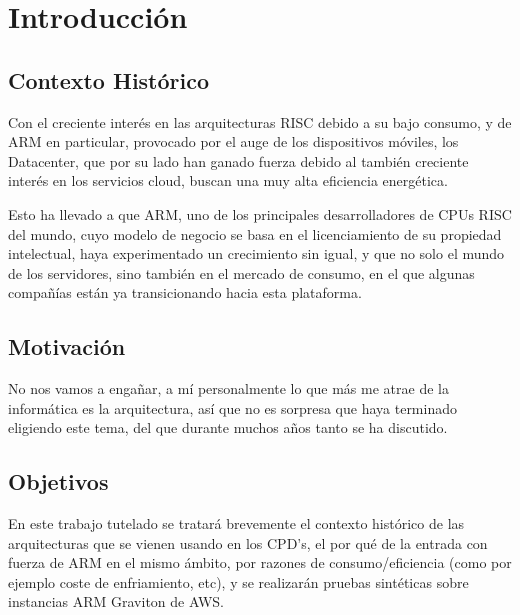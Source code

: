 \documentclass[a4paper,openright,12pt]{article}
\begin{document}
\section{Introducción}\label{section:introduccion}
\subsection{Contexto Histórico}
Con el creciente interés en las arquitecturas RISC debido a su bajo consumo, y de ARM en particular, provocado por el auge de los dispositivos móviles,
los Datacenter, que por su lado han ganado fuerza debido al también creciente interés en los servicios cloud, buscan una muy alta eficiencia
energética.

Esto ha llevado a que ARM, uno de los principales desarrolladores de CPUs RISC del mundo, cuyo modelo de negocio se basa en el licenciamiento de su propiedad intelectual,
haya experimentado un crecimiento sin igual, y que no solo el mundo de los servidores, sino también en el mercado de consumo, en el que algunas compañías están ya transicionando
hacia esta plataforma. \parencite{apple_m1_overview}

\subsection{Motivación}\label{subsection:motivacion}
No nos vamos a engañar, a mí personalmente lo que más me atrae de la informática es la arquitectura, así que no es sorpresa que haya terminado eligiendo este tema, del que durante muchos
años tanto se ha discutido. \parencite{risc_vs_cisc_6522302}

\subsection{Objetivos}\label{subsection:objetivos}
En este trabajo tutelado se tratará brevemente el contexto histórico de las arquitecturas que se vienen usando en los CPD's, el por qué de la entrada con fuerza de ARM en el
mismo ámbito, por razones de consumo/eficiencia (como por ejemplo coste de enfriamiento, etc), y se realizarán pruebas sintéticas sobre instancias ARM Graviton de AWS.\parencite{arm_aws_graviton_overview}
\end{document}
